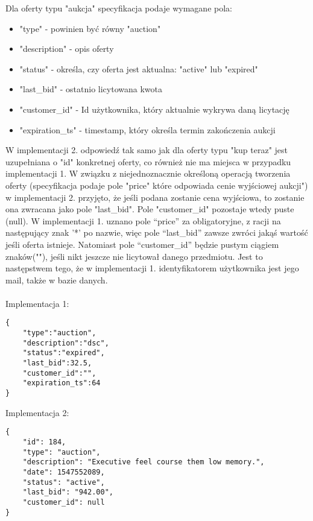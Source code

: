 \documentclass[12pt, notitlepage]{article}
\begin{document}
Dla oferty typu "aukcja" specyfikacja podaje wymagane pola: 
\begin{itemize}
    \item "type" - powinien być równy "auction"
    \item "description" - opis oferty
    \item "status" - określa, czy oferta jest aktualna: "active" lub "expired"
    \item "last\_bid" - ostatnio licytowana kwota
    \item "customer\_id" - Id użytkownika, który aktualnie wykrywa daną licytację
    \item "expiration\_ts" - timestamp, który określa termin zakończenia aukcji
\end{itemize}

W implementacji 2. odpowiedź tak samo jak dla oferty typu "kup teraz" jest uzupełniana o "id" konkretnej oferty, co również nie ma miejsca w przypadku implementacji 1. W związku z niejednoznacznie określoną operacją tworzenia oferty (specyfikacja podaje pole "price" które odpowiada cenie wyjściowej aukcji") w implementacji 2. przyjęto, że jeśli podana zostanie cena wyjściowa, to zostanie ona zwracana jako pole "last\_bid". Pole "customer\_id" pozostaje wtedy puste (null). W implementacji 1. uznano pole ``price'' za obligatoryjne, z racji na następujący znak '*' po nazwie, więc pole ``last\_bid'' zawsze zwróci jakąś wartość jeśli oferta istnieje. Natomiast pole ``customer\_id'' będzie pustym ciągiem znaków(""), jeśli nikt jeszcze nie licytował danego przedmiotu. Jest to następstwem tego, że w implementacji 1. identyfikatorem użytkownika jest jego mail, także w bazie danych.\\
\\Implementacja 1:
\begin{lstlisting}
{
    "type":"auction",
    "description":"dsc",
    "status":"expired",
    "last_bid":32.5,
    "customer_id":"",
    "expiration_ts":64
}
\end{lstlisting}
Implementacja 2:
\begin{lstlisting}
{
    "id": 184,
    "type": "auction",
    "description": "Executive feel course them low memory.",
    "date": 1547552089,
    "status": "active",
    "last_bid": "942.00",
    "customer_id": null
}
\end{lstlisting}
\end{document}
